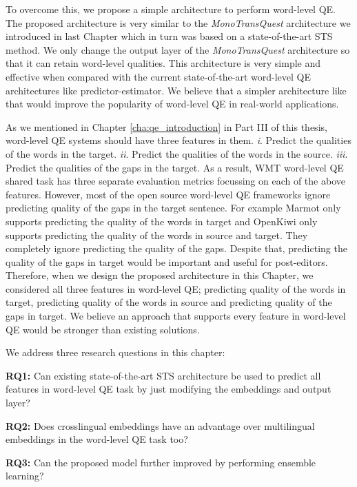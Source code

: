 To overcome this, we propose a simple architecture to perform word-level QE. The proposed architecture is very similar to the \textit{MonoTransQuest} architecture we introduced in last Chapter which in turn was based on a state-of-the-art STS method. We only change the output layer of the \textit{MonoTransQuest} architecture so that it can retain word-level qualities. This architecture is very simple and effective when compared with the current state-of-the-art word-level QE architectures like predictor-estimator. We believe that a simpler architecture like that would improve the popularity of word-level QE in real-world applications. 

As we mentioned in Chapter \ref{cha:qe_introduction} in Part III of this thesis, word-level QE systems should have three features in them. \textit{i}. Predict the qualities of the words in the target. \textit{ii}. Predict the qualities of the words in the source. \textit{iii}. Predict the qualities of the gaps in the target. As a result, WMT word-level QE shared task has three separate evaluation metrics focussing on each of the above features. However, most of the open source word-level QE frameworks ignore predicting quality of the gaps in the target sentence. For example Marmot \cite{logacheva-etal-2016-marmot} only supports predicting the quality of the words in target and OpenKiwi \cite{kepler-etal-2019-openkiwi} only supports predicting the quality of the words in source and target. They completely ignore predicting the quality of the gaps. Despite that, predicting the quality of the gaps in target would be important and useful for post-editors. Therefore, when we design the proposed architecture in this Chapter, we considered all three features in word-level QE; predicting quality of the words in target, predicting quality of the words in source and predicting quality of the gaps in target. We believe an approach that supports every feature in word-level QE would be stronger than existing solutions.

We address three research questions in this chapter:

\textbf{RQ1:} Can existing state-of-the-art STS architecture be used to predict all features in word-level QE task by just modifying the embeddings and output layer?

\textbf{RQ2:} Does crosslingual embeddings have an advantage over multilingual embeddings in the word-level QE task too?

\textbf{RQ3:} Can the proposed model further improved by performing ensemble learning?

